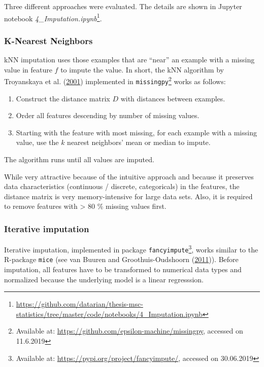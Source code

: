 \documentclass[
  11pt,
  a4paper,
  DIV=12,captions=tableheading,oneside,titlepage]{scrbook}
\providecommand{\tightlist}{%
  \setlength{\itemsep}{0pt}\setlength{\parskip}{0pt}}
\begin{document}
Three different approaches were evaluated. The details are shown in Jupyter notebook \emph{4\_Imputation.ipynb}\footnote{\url{https://github.com/datarian/thesis-msc-statistics/tree/master/code/notebooks/4_Imputation.ipynb}}.

\hypertarget{k-nearest-neighbors}{%
\subsubsection{K-Nearest Neighbors}\label{k-nearest-neighbors}}

kNN imputation uses those examples that are ``near'' an example with a missing value in feature \(f\) to impute the value. In short, the kNN algorithm by Troyanskaya et al. (\protect\hyperlink{ref-troyanskaya2001missing}{2001}) implemented in \texttt{missingpy}\footnote{Available at: \url{https://github.com/epsilon-machine/missingpy}, accessed on 11.6.2019} works as follows:

\begin{enumerate}
\def\labelenumi{\arabic{enumi}.}
\tightlist
\item
  Construct the distance matrix \(D\) with distances between examples.
\item
  Order all features descending by number of missing values.
\item
  Starting with the feature with most missing, for each example with a missing value, use the \(k\) nearest neighbors' mean or median to impute.
\end{enumerate}

The algorithm runs until all values are imputed.

While very attractive because of the intuitive approach and because it preserves data characteristics (continuous / discrete, categoricals) in the features, the distance matrix is very memory-intensive for large data sets. Also, it is required to remove features with \textgreater{} 80 \% missing values first.

\hypertarget{iterative-imputation}{%
\subsubsection{Iterative imputation}\label{iterative-imputation}}

Iterative imputation, implemented in package \texttt{fancyimpute}\footnote{Available at: \url{https://pypi.org/project/fancyimpute/}, accessed on 30.06.2019}, works similar to the R-package \texttt{mice} (see van Buuren and Groothuis-Oudshoorn (\protect\hyperlink{ref-buuren2011mice}{2011})). Before imputation, all features have to be transformed to numerical data types and normalized because the underlying model is a linear regresssion.
\end{document}
